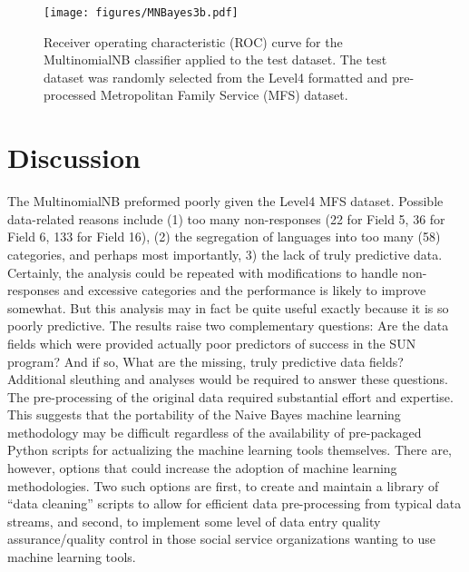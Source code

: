 \documentclass[twoside]{article}	%
\begin{document}
\begin{figure}
	\begin{center}
		\texttt{[image: figures/MNBayes3b.pdf]}
		\caption{Receiver operating characteristic (ROC) curve for the MultinomialNB classifier applied to the test dataset. The test dataset was randomly selected from the Level4 formatted and pre-processed Metropolitan Family Service (MFS) dataset.}
		\label{fig:bm2}
	\end{center}
\end{figure}


\section{Discussion}
The MultinomialNB preformed poorly given the Level4 MFS dataset. Possible data-related reasons include (1) too many non-responses (22 for Field 5, 36 for Field 6, 133 for Field 16), (2) the segregation of languages into too many (58) categories, and perhaps most importantly, 3) the lack of truly predictive data. Certainly, the analysis could be repeated with modifications to handle non-responses and excessive categories and the performance is likely to improve somewhat. But this analysis may in fact be quite useful exactly because it is so poorly predictive. The results raise two complementary questions: Are the data fields which were provided actually poor predictors of success in the SUN program? And if so, What are the missing, truly predictive data fields? Additional sleuthing and analyses would be required to answer these questions.\\

\noindent The pre-processing of the original data required substantial effort and expertise. This suggests that the portability of the Naive Bayes machine learning methodology may be difficult regardless of the availability of pre-packaged Python scripts for actualizing the machine learning tools themselves. There are, however, options that could increase the adoption of machine learning methodologies. Two such options are first, to create and maintain a library of \enquote{data cleaning} scripts to allow for efficient data pre-processing from typical data streams, and second, to implement some level of data entry quality assurance/quality control in those social service organizations wanting to use machine learning tools.\\

 
\end{document}
